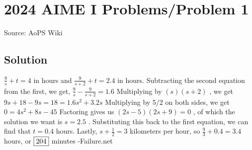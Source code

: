 \documentclass[12pt]{article}
\begin{document}
\section*{{2024 AIME I Problems/Problem 1}}
Source: AoPS Wiki

\subsection*{Solution}
$\frac{9}{s} + t = 4$ in hours and $\frac{9}{s+2} + t = 2.4$ in hours. Subtracting the second equation from the first, we get, $\frac{9}{s} - \frac{9}{s+2} = 1.6$ Multiplying by $(s)(s+2)$ , we get $9s+18-9s=18=1.6s^{2} + 3.2s$ Multiplying by 5/2 on both sides, we get $0 = 4s^{2} + 8s - 45$ Factoring gives us $(2s-5)(2s+9) = 0$ , of which the solution we want is $s=2.5$ . Substituting this back to the first equation, we can find that $t = 0.4$ hours. Lastly, $s + \frac{1}{2} = 3$ kilometers per hour, so $\frac{9}{3} + 0.4 = 3.4$ hours, or $\framebox{204}$ minutes -Failure.net
\end{document}
